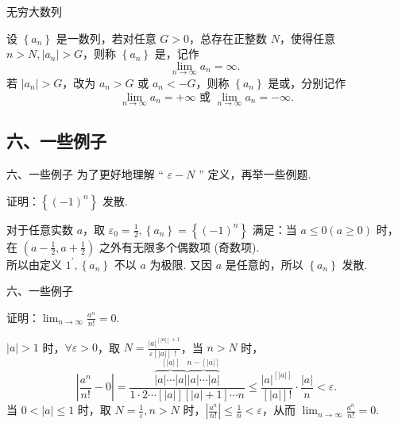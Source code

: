 \documentclass[mathserif]{beamer}
\begin{document}
\begin{frame}{无穷大数列}%
	\begin{dfn}
		\suojin 设 $\left\{a_n\right\}$ 是一数列，若对任意 $G>0$，总存在正整数 $N$，使得任意 $n>N,\left|a_n\right|>G$，则称 $\left\{a_n\right\}$ 是，记作
		$$
		\lim _{n \rightarrow \infty} a_n=\infty \text {. }
		$$
		\suojin 若 $\left|a_n\right|>G$，改为 $a_n>G$ 或 $a_n<-G$，则称 $\left\{a_n\right\}$ 是或，分别记作
		$$
		\lim _{n \rightarrow \infty} a_n=+\infty \text { 或 } \lim _{n \rightarrow \infty} a_n=-\infty . 
		$$  
	\end{dfn}  
\end{frame}



\subsection{六、一些例子}
\begin{frame}{ 六、一些例子}%
	\suojin 为了更好地理解 “ $\varepsilon-N$ ” 定义，再举一些例题.
	\begin{ex}
		\suojin 证明：$\left\{(-1)^n\right\}$ 发散.
	\end{ex} 
\pause
	\begin{proofs}
	\suojin 对于任意实数 $a$，取 $\varepsilon_0=\frac{1}{2},\left\{a_n\right\}=\left\{(-1)^n\right\}$ 满足：当 $a \leq 0(a \geq 0)$ 时，在 $\left(a-\frac{1}{2}, a+\frac{1}{2}\right)$ 之外有无限多个偶数项 (奇数项). \\
	\suojin 所以由定义 $1^{\prime},\left\{a_n\right\}$ 不以 $a$ 为极限. 又因 $a$ 是任意的，所以 $\left\{a_n\right\}$ 发散.
	\end{proofs}  
\end{frame}


\begin{frame}{六、一些例子}%
	\begin{ex}
		\suojin 证明：$\lim _{n \rightarrow \infty} \frac{a^n}{n !}=0$.
	\end{ex} 
\pause
	\begin{proofs}
		\suojin  $|a|>1$ 时，$\forall \varepsilon>0$，取 $N=\frac{|a|^{[|a |]+1}}{\varepsilon[|a|] \text { ! }}$，当 $n>N$ 时，
	$$
	\left|\frac{a^n}{n !}-0\right|=\frac{\overbrace{|a| \cdots|a|}^{[|a|]} \overbrace{|a| \cdots|a|}^{n-[|a|]} }{1 \cdot 2 \cdots[|a|][|a|+1] \cdots n} \leq \frac{|a|^{[|a|]}}{[|a|] !} \cdot \frac{|a|}{n}<\varepsilon .
	$$
	当 $0<|a| \leq 1$ 时，取 $N=\frac{1}{\varepsilon}, n>N$ 时，$\left|\frac{a^n}{n !}\right| \leq \frac{1}{n}<\varepsilon$，从而 $\lim _{n \rightarrow \infty} \frac{a^n}{n !}=0$.  
    \end{proofs}  
\end{frame}
\end{document}
